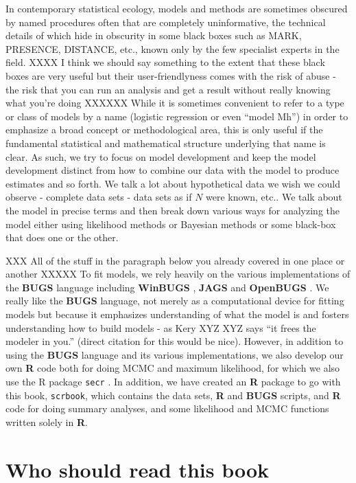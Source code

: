 In contemporary statistical ecology, models and methods are sometimes
obscured by named procedures often that are completely uninformative,
the technical details of which hide in obscurity in some black boxes
such as MARK, PRESENCE, DISTANCE, etc., known only by the few
specialist experts in the field. 
XXXX I think we should say something to the extent that these black boxes are very useful but their user-friendlyness comes with the risk of abuse - the risk that you can run an analysis and get a result without really knowing what you're doing XXXXXX
While it is sometimes convenient to
refer to a type or class of models by a name (logistic regression or
even ``model Mh'') in order to emphasize a broad concept or
methodological area, this is only useful if the fundamental
statistical and mathematical structure underlying that name is
clear. As such, we try to focus on model development and keep the
model development distinct from how to combine our data with the model
to produce estimates and so forth. We talk a lot about hypothetical
data we wish we could observe - complete data sets - data sets as if
$N$ were known, etc.. We talk about the model in precise terms and
then break down various ways for analyzing the model either using
likelihood methods or Bayesian methods or some black-box that does one
or the other.

XXX All of the stuff in the paragraph below you already covered in one place or another XXXXX
To fit models, we rely heavily on the various implementations of the
{\bf BUGS} language including {\bf WinBUGS} \citep{lunn_etal:2000},
{\bf JAGS} \citep{plummer:2003}
 and {\bf OpenBUGS} \citep{thomas_etal:2006}. We really like
the {\bf BUGS} language, not merely  as a computational device for
fitting models but because it emphasizes
understanding of what the model is and fosters understanding how to
build models - as Kery XYZ XYZ says ``it frees the modeler in you.''  (direct
citation for this would be nice).  However, in addition to using the
{\bf BUGS} language and its various implementations, we also develop our own
{\bf R} code both for doing MCMC
and maximum likelihood, for which we also use the R
package \mbox{\tt secr} \citep{efford:2011}. In addition, we have
created an {\bf R} package to go with this book, \mbox{\tt scrbook},
which contains the data sets, {\bf R} and {\bf BUGS} scripts, and {\bf
  R} code for doing summary analyses, and some likelihood and MCMC
functions written solely in {\bf R}.


\section*{Who should read this book}

